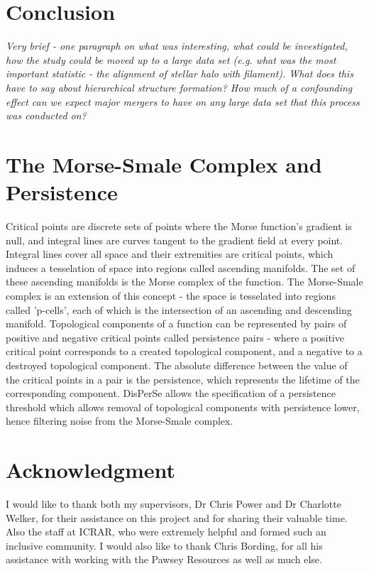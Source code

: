 \documentclass[journal]{IEEEtran}
\begin{document}
\section{Conclusion}
\textit{Very brief - one paragraph on what was interesting, what could be investigated, how the study could be moved up to a large data set (e.g. what was the most important statistic - the alignment of stellar halo with filament).
What does this have to say about hierarchical structure formation? How much of a confounding effect can we expect major mergers to have on any large data set that this process was conducted on?}


\appendices
\section{The Morse-Smale Complex and Persistence}
Critical points are discrete sets of points where the Morse function's gradient is null, and integral lines are curves tangent to the gradient field at every point. Integral lines cover all space and their extremities are critical points, which induces a tesselation of space into regions called ascending manifolds. The set of these ascending manifolds is the Morse complex of the function. The Morse-Smale complex is an extension of this concept - the space is tesselated into regions called 'p-cells', each of which is the intersection of an ascending and descending manifold. 
Topological components of a function can be represented by pairs of positive and negative critical points called persistence pairs - where a positive critical point corresponds to a created topological component, and a negative to a destroyed topological component. The absolute difference between the value of the critical points in a pair is the persistence, which represents the lifetime of the corresponding component. DisPerSe allows the specification of a persistence threshold which allows removal of topological components with persistence lower, hence filtering noise from the Morse-Smale complex. 

\section*{Acknowledgment}
I would like to thank both my supervisors, Dr Chris Power and Dr Charlotte Welker, for their assistance on this project and for sharing their valuable time. Also the staff at ICRAR, who were extremely helpful and formed such an inclusive community. I would also like to thank Chris Bording, for all his assistance with working with the Pawsey Resources as well as much else. 
\end{document}
